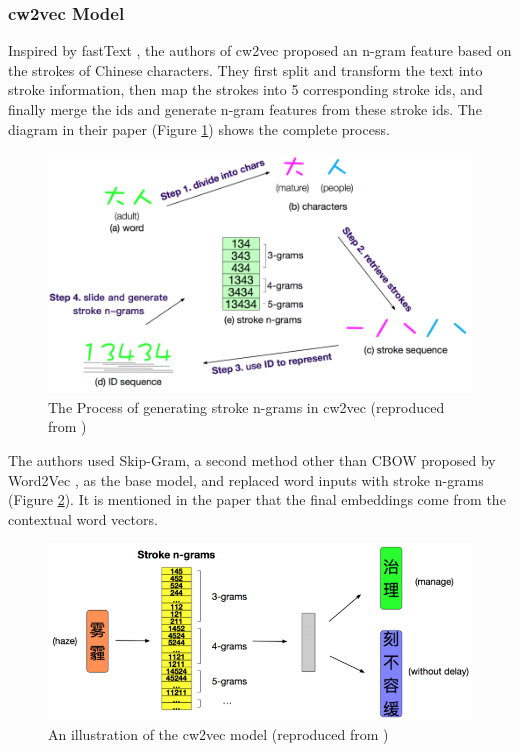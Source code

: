 \subsubsection{cw2vec Model}

Inspired by fastText \cite{bojanowski2017enriching}, the authors of cw2vec \cite{cao2018cw2vec} proposed an n-gram feature based on the strokes of Chinese characters. They first split and transform the text into stroke information, then map the strokes into 5 corresponding stroke ids, and finally merge the ids and generate n-gram features from these stroke ids. The diagram in their paper (Figure \ref{fig:cw2vec1}) shows the complete process.

\begin{figure}[h]
	\centering
	\includegraphics[scale=0.6]{../images/cw2vec_illustration1.png}
	\caption{The Process of generating stroke n-grams in cw2vec (reproduced from \cite{cao2018cw2vec})}
	\label{fig:cw2vec1}
\end{figure}

The authors used Skip-Gram, a second method other than CBOW proposed by Word2Vec \cite{mikolov2013efficient}, as the base model, and replaced word inputs with stroke n-grams (Figure \ref{fig:cw2vec2}). It is mentioned in the paper that the final embeddings come from the contextual word vectors.

\begin{figure}[h]
	\centering
	\includegraphics[scale=0.6]{../images/cw2vec_illustration2.png}
	\caption{An illustration of the cw2vec model (reproduced from \cite{cao2018cw2vec})}
	\label{fig:cw2vec2}
\end{figure}

